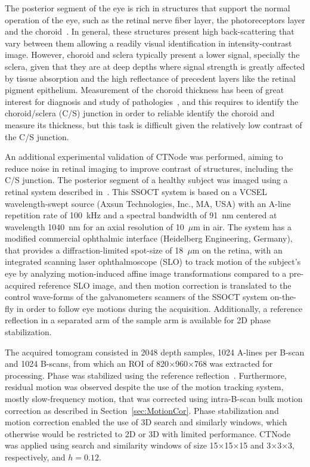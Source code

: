 The posterior segment of the eye is rich in structures that support the normal operation of the eye, such as the retinal nerve fiber layer, the photoreceptors layer and the choroid~\cite{Drexler2015_Retinal}. In general, these structures present high back-scattering that vary between them allowing a readily visual identification in intensity-contrast image. However, choroid and sclera typically present a lower signal, specially the sclera, given that they are at deep depths where signal strength is greatly affected by tissue absorption and the high reflectance of precedent layers like the retinal pigment epithelium. Measurement of the choroid thickness has been of great interest for diagnosis and study of pathologies~\cite{Yiu2014_Characterization}, and this requires to identify the choroid/sclera (C/S) junction in order to reliable identify the choroid and measure its thickness, but this task is difficult given the relatively low contrast of the C/S junction. 

An additional experimental validation of CTNode was performed, aiming to reduce noise in retinal imaging to improve contrast of structures, including the C/S junction. The posterior segment of a healthy subject was imaged using a retinal system described in~\cite{Braaf2018_Complex}. This SSOCT system is based on a VCSEL wavelength-swept source (Axsun Technologies, Inc., MA, USA) with an A-line repetition rate of 100~kHz and a spectral bandwidth of 91~nm centered at wavelength 1040~nm for an axial resolution of 10~$\mu$m in air. The system has a modified commercial ophthalmic interface (Heidelberg Engineering, Germany), that provides a diffraction-limited spot-size of 18~$\mu$m on the retina, with an integrated scanning laser ophthalmoscope (SLO) to track motion of the subject's eye by analyzing motion-induced affine image transformations compared to a pre-acquired reference SLO image, and then motion correction is translated to the control wave-forms of the galvanometers scanners of the SSOCT system on-the-fly in order to follow eye motions during the acquisition. Additionally, a reference reflection in a separated arm of the sample arm is available for 2D phase stabilization.

The acquired tomogram consisted in 2048 depth samples, 1024 A-lines per B-scan and 1024 B-scans, from which an ROI of 820$\times$960$\times$768 was extracted for processing. Phase was stabilized using the reference reflection~\cite{Vakoc2005_Phaseresolved}. Furthermore, residual motion was observed despite the use of the motion tracking system, mostly slow-frequency motion, that was corrected using intra-B-scan bulk motion correction as described in Section~\ref{sec:MotionCor}. Phase stabilization and motion correction enabled the use of 3D search and similarly windows, which otherwise would be restricted to 2D or 3D with limited performance. CTNode was applied using search and similarity windows of size 15$\times$15$\times$15 and 3$\times$3$\times$3, respectively, and $h=0.12$.

